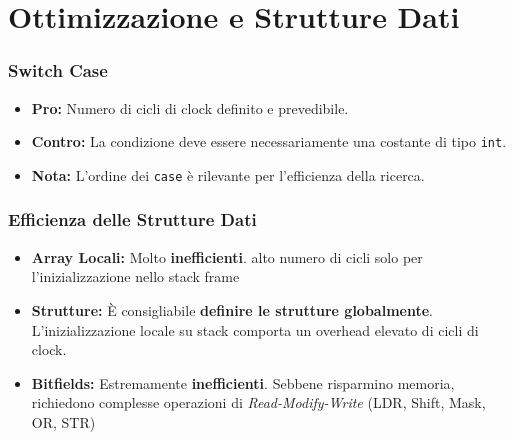 \section{Ottimizzazione e Strutture Dati}

\subsubsection{Switch Case}
\begin{itemize}
    \item \textbf{Pro:} Numero di cicli di clock definito e prevedibile.
    \item \textbf{Contro:} La condizione deve essere necessariamente una costante di tipo \texttt{int}.
    \item \textbf{Nota:} L'ordine dei \texttt{case} è rilevante per l'efficienza della ricerca.
\end{itemize}

\subsubsection{Efficienza delle Strutture Dati}
\begin{itemize}
    \item \textbf{Array Locali:} Molto \textbf{inefficienti}. 
    alto numero di cicli solo per l'inizializzazione nello stack frame 
    \item \textbf{Strutture:} È consigliabile \textbf{definire le strutture globalmente}. L'inizializzazione locale su stack comporta un overhead elevato di cicli di clock.
    \item \textbf{Bitfields:} Estremamente \textbf{inefficienti}. 
    Sebbene risparmino memoria, richiedono complesse operazioni di
     \textit{Read-Modify-Write} (LDR, Shift, Mask, OR, STR)
\end{itemize}